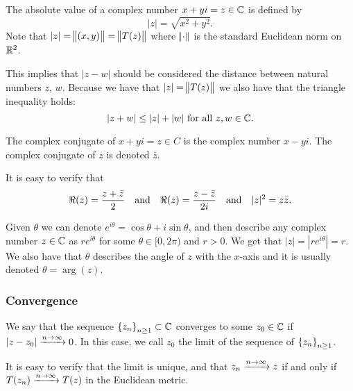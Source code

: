 \documentclass[11pt,a4paper]{article}
\begin{document}
The absolute value of a complex number $x + y i = z \in \mathbb{C}$ is defined by
\[
  |z| = \sqrt{x^2 + y^2}.
\]
Note that $|z| = \norm{(x,y)}= \norm{T(z)}$ where $\norm{\cdot}$ is the standard
Euclidean norm on $\mathbb{R}^2$.

This implies that $|z - w|$ should be considered the distance between natural
numbers $z$, $w$.
Because we have that $|z| = \norm{T(z)}$ we also have that the triangle
inequality holds:
\[
  |z + w| \le |z| + |w| \text{ for all } z,w \in \mathbb{C}.
\]

\begin{definition}
  The complex conjugate of $x + y i = z \in C$ is the complex number
  $x - y i$. The complex conjugate of $z$ is denoted $\bar{z}$.
\end{definition}

\begin{center}
\end{center}

It is easy to verify that
\[
  \Re(z) = \frac{z + \bar{z}}{2} \quad \text{and} \quad 
  \Re(z) = \frac{z - \bar{z}}{2 i} \quad \text{and} \quad
  |z|^2 = z \bar{z}.
\]

Given $\theta$ we can denote $e^{i \theta} = \cos \theta + i \sin \theta$,
and then describe any complex number $z \in \mathbb{C}$ as $r e^{i \theta}$
for some $\theta \in [0, 2\pi)$ and $r > 0$.
We get that $|z| = |r e^{i \theta}| = r$.
We also have that $\theta$ describes the angle of $z$ with the $x$-axis
and it is usually denoted $\theta = \arg(z)$.

\subsubsection{Convergence}

\begin{definition}[Convergence]
  We say that the sequence $\set{z_n}_{n \geq 1} \subset \mathbb{C}$ converges
  to some $z_0 \in \mathbb{C}$ if $|z - z_0| \xrightarrow{n \to \infty} 0$.
  In this case, we call $z_0$ the limit of the sequence of
  $\set{z_n}_{n \geq 1}$.
\end{definition}

\begin{remark}
  It is easy to verify that the limit is unique, and that
  $z_n \xrightarrow{n \to \infty} z$ if and only if
  $T(z_n) \xrightarrow{n \to \infty} T(z)$ in the Euclidean metric.
\end{remark}
\end{document}
